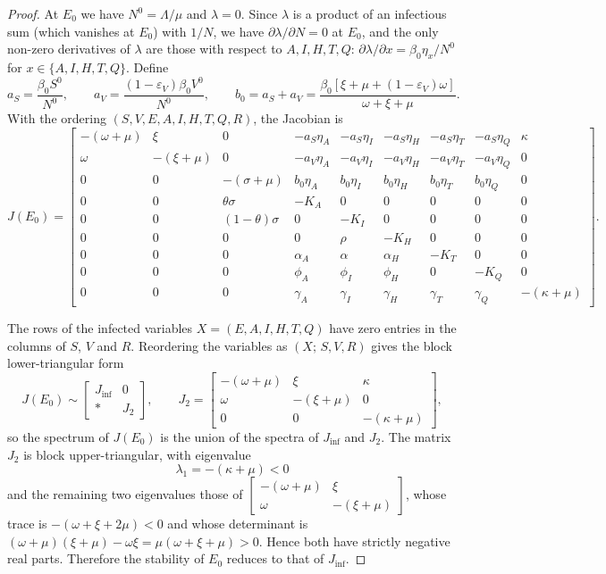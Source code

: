 \documentclass[12pt,a4paper]{article}
\theoremstyle{definition}
\theoremstyle{remark}
\begin{document}
\begin{proof}

At $E_0$ we have $N^0=\Lambda/\mu$ and $\lambda=0$. Since $\lambda$ is a product
of an infectious sum (which vanishes at $E_0$) with $1/N$, we have
$\partial\lambda/\partial N=0$ at $E_0$, and the only non-zero derivatives of
$\lambda$ are those with respect to $A,I,H,T,Q$:
$\partial\lambda/\partial x=\beta_0\eta_x/N^0$ for $x\in\{A,I,H,T,Q\}$.
Define
\[
a_S=\frac{\beta_0S^0}{N^0},\qquad
a_V=\frac{(1-\varepsilon_V)\beta_0V^0}{N^0},\qquad
b_0=a_S+a_V=\frac{\beta_0\left[\xi+\mu+(1-\varepsilon_V)\omega\right]}{\omega+\xi+\mu}.
\]
With the ordering $(S,V,E,A,I,H,T,Q,R)$, the Jacobian is
\[
J(E_0)=
\begin{bmatrix}
-(\omega+\mu) & \xi & 0 & -a_S\eta_A & -a_S\eta_I & -a_S\eta_H & -a_S\eta_T & -a_S\eta_Q & \kappa\\
\omega & -(\xi+\mu) & 0 & -a_V\eta_A & -a_V\eta_I & -a_V\eta_H & -a_V\eta_T & -a_V\eta_Q & 0\\
0&0&-(\sigma+\mu)& b_0\eta_A & b_0\eta_I & b_0\eta_H & b_0\eta_T & b_0\eta_Q & 0\\
0&0&\theta\sigma&-K_A&0&0&0&0&0\\
0&0&(1-\theta)\sigma&0&-K_I&0&0&0&0\\
0&0&0&0&\rho&-K_H&0&0&0\\
0&0&0&\alpha_A&\alpha&\alpha_H&-K_T&0&0\\
0&0&0&\phi_A&\phi_I&\phi_H&0&-K_Q&0\\
0&0&0&\gamma_A&\gamma_I&\gamma_H&\gamma_T&\gamma_Q&-(\kappa+\mu)
\end{bmatrix}.
\]


The rows of the infected variables $X=(E,A,I,H,T,Q)$ have zero entries in the
columns of $S$, $V$ and $R$. Reordering the variables as $(X;\,S,V,R)$ gives
the block lower-triangular form
\[
J(E_0)\sim
\begin{bmatrix}
J_{\inf} & 0\\
\ast & J_{2}
\end{bmatrix},\qquad
J_2=
\begin{bmatrix}
-(\omega+\mu) & \xi & \kappa\\
\omega & -(\xi+\mu) & 0\\
0&0&-(\kappa+\mu)
\end{bmatrix},
\]
so the spectrum of $J(E_0)$ is the union of the spectra of $J_{\inf}$ and $J_2$.
The matrix $J_2$ is block upper-triangular, with eigenvalue
\[
\lambda_1=-(\kappa+\mu)<0
\]
and the remaining two eigenvalues those of
$\begin{bmatrix}-(\omega+\mu)&\xi\\ \omega&-(\xi+\mu)\end{bmatrix}$, whose
trace is $-(\omega+\xi+2\mu)<0$ and whose determinant is
$(\omega+\mu)(\xi+\mu)-\omega\xi=\mu(\omega+\xi+\mu)>0$. Hence both have
strictly negative real parts. Therefore the stability of $E_0$ reduces to that
of $J_{\inf}$.



\end{proof}
\end{document}
